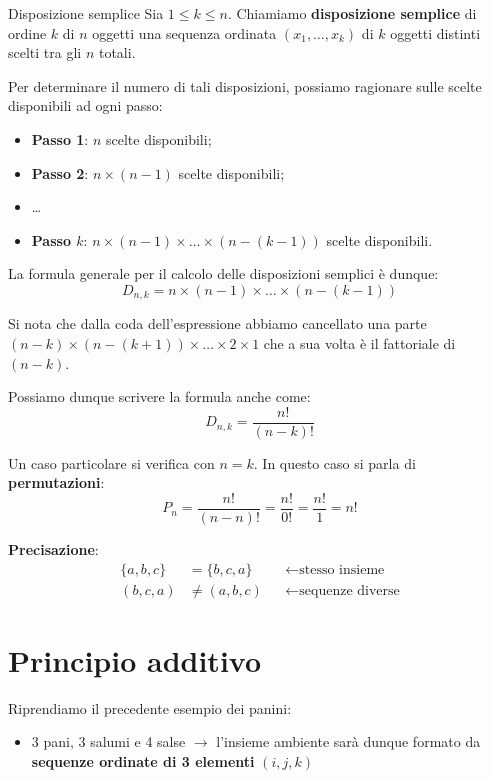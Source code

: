 \documentclass[12pt]{report}
\begin{document}
	\begin{definizione}{Disposizione semplice}{}
		Sia $1 \le k \le n$. Chiamiamo \textbf{disposizione semplice} di ordine $k$ di $n$ oggetti una sequenza ordinata $(x_1, \dots, x_k)$ di $k$ oggetti distinti scelti tra gli $n$ totali.
	\end{definizione}
	
	Per determinare il numero di tali disposizioni, possiamo ragionare sulle scelte disponibili ad ogni passo:
	\begin{itemize}
		\item \textbf{Passo 1}: $n$ scelte disponibili;
		\item \textbf{Passo 2}: $n \times (n-1)$ scelte disponibili;
		\item[] \dots
		\item \textbf{Passo $k$}: $n \times (n-1) \times \dots \times (n - (k-1))$ scelte disponibili.
	\end{itemize}
	
	La formula generale per il calcolo delle disposizioni semplici è dunque:
	\[
	D_{n,k} = n \times (n-1) \times \dots \times (n - (k-1))
	\]
	
	Si nota che dalla coda dell'espressione abbiamo cancellato una parte $(n-k) \times (n-(k+1)) \times \dots \times 2 \times 1$ che a sua volta è il fattoriale di $(n-k)$.
	
	Possiamo dunque scrivere la formula anche come:
	\[
	D_{n,k} = \frac{n!}{(n-k)!}
	\]
	
	Un caso particolare si verifica con $n=k$. In questo caso si parla di \textbf{permutazioni}:
	\[
	P_n = \frac{n!}{(n-n)!} = \frac{n!}{0!} = \frac{n!}{1} = n!
	\]
	
	\textbf{Precisazione}:
	\[
	\begin{aligned}
		\{a, b, c\} &= \{b, c, a\} && \longleftarrow \text{stesso insieme} \\
		(b, c, a) &\neq (a, b, c) && \longleftarrow \text{sequenze diverse}
	\end{aligned}
	\]
	
	\section{Principio additivo}
	
	Riprendiamo il precedente esempio dei panini:
	\begin{itemize}
		\item 3 pani, 3 salumi e 4 salse $\longrightarrow$ l'insieme ambiente sarà dunque formato da \textbf{sequenze ordinate di 3 elementi} $(i, j, k)$
	\end{itemize}
	
\end{document}
